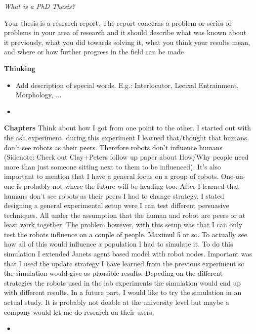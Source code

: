 \textit{What is a PhD Thesis?} 

Your thesis is a research report. The report concerns a problem or series of problems in your area of research and it should describe what was known about it previously, what you did towards solving it, what you think your results mean, and where or how further progress in the field can be made

\textbf{Thinking}
\begin{itemize}
\item Add description of special words. E.g.: Interlocutor, Lecixal Entrainment, Morphology, ...
\item
\end{itemize}

\textbf{Chapters}
Think about how I got from one point to the other. I started out with the ash experiment. during this experiment I learned that/thought that humans don't see robots as their peers. Therefore robots don't influence humans (Sidenote: Check out Clay+Peters follow up paper about How/Why people need more than just someone sitting next to them to be influenced). It's also important to mention that I have a general focus on a group of robots. One-on-one is probably not where the future will be heading too. After I learned that humans don't see robots as their peers I had to change strategy. I stated designing a general experimental setup were I can test different persuasive techniques. All under the assumption that the human and robot are peers or at least work together. The problem however, with this setup was that I can only test the robots influence on a couple of people. Maximul 5 or so. To actually see how all of this would influence a population I had to simulate it. To do this simulation I extended Janets agent based model with robot nodes. Important was that I used the update strategy I have learned from the previous experiment so the simulation would give as plausible results. Depeding on the different strategies the robots used in the lab experiments the simulation would end up with different results. 
In a future part, I would like to try the simulation in an actual study. It is probably not doable at the university level but maybe a company would let me do research on their users.
\begin{itemize}
\item 
\end{itemize}